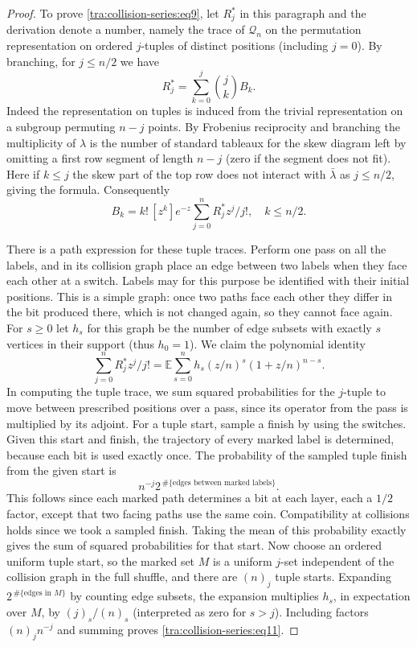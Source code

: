 \begin{proof}\label{tra:collision-series:sparse-trace-proof}
\label{tra:collision-series:collision-generating-function}
To prove \eqref{tra:collision-series:eq9}, let \(R_j^*\) in this paragraph and the derivation denote a number, namely the trace of \(\mathcal Q_n\) on the permutation representation on ordered \(j\)-tuples of distinct positions (including \(j=0\)). By branching, for \(j\le n/2\) we have
\[
R_j^*=\sum_{k=0}^j \binom jk B_k.
\]
Indeed the representation on tuples is induced from the trivial representation on a subgroup permuting \(n-j\) points. By Frobenius reciprocity and branching the multiplicity of \(\lambda\) is the number of standard tableaux for the skew diagram left by omitting a first row segment of length \(n-j\) (zero if the segment does not fit). Here if \(k\le j\) the skew part of the top row does not interact with \(\bar\lambda\) as \(j\le n/2\), giving the formula. Consequently
\begin{equation}
B_k=k!\,[z^k]e^{-z}\sum_{j=0}^n R_j^* z^j/j!, \quad k\le n/2. \label{tra:collision-series:eq10}
\end{equation}

There is a path expression for these tuple traces. Perform one pass on all the labels, and in its collision graph place an edge between two labels when they face each other at a switch. Labels may for this purpose be identified with their initial positions. This is a simple graph: once two paths face each other they differ in the bit produced there, which is not changed again, so they cannot face again. For \(s\ge 0\) let \(h_s\) for this graph be the number of edge subsets with exactly \(s\) vertices in their support (thus \(h_0=1\)). We claim the polynomial identity
\begin{equation}
\sum_{j=0}^n R_j^* z^j/j!
 =\mathbb E\sum_{s=0}^n h_s (z/n)^s(1+z/n)^{n-s}. \label{tra:collision-series:eq11}
\end{equation}
In computing the tuple trace, we sum squared probabilities for the \(j\)-tuple to move between prescribed positions over a pass, since its operator from the pass is multiplied by its adjoint. For a tuple start, sample a finish by using the switches. Given this start and finish, the trajectory of every marked label is determined, because each bit is used exactly once. The probability of the sampled tuple finish from the given start is
\[
n^{-j} 2^{\,\#\{\text{edges between marked labels}\}}.
\]
This follows since each marked path determines a bit at each layer, each a \(1/2\) factor, except that two facing paths use the same coin. Compatibility at collisions holds since we took a sampled finish. Taking the mean of this probability exactly gives the sum of squared probabilities for that start. Now choose an ordered uniform tuple start, so the marked set \(M\) is a uniform \(j\)-set independent of the collision graph in the full shuffle, and there are \((n)_j\) tuple starts. Expanding \(2^{\,\#\{\text{edges in }M\}}\) by counting edge subsets, the expansion multiplies \(h_s\), in expectation over \(M\), by \((j)_s/(n)_s\) (interpreted as zero for \(s>j\)). Including factors \((n)_j n^{-j}\) and summing proves \eqref{tra:collision-series:eq11}.


\end{proof}
